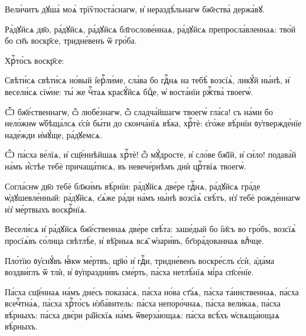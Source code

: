 \hKv Вели́читъ дꙋша̀ моѧ̀ трїѷпоста́снагѡ, и҆ нераздѣ́льнагѡ  бж҃ества̀ держа́вꙋ. 

\hKv Ра́дꙋйсѧ дв҃о, ра́дꙋйсѧ, ра́дꙋйсѧ бл҃гослове́ннаѧ, ра́дꙋйсѧ  препросла́вленнаѧ: тво́й бо сн҃ъ воскр҃се, тридне́венъ ѿ  гро́ба. 

 Хрⷭ҇то́съ воскр҃се:   
%

\hKv Свѣти́сѧ свѣти́сѧ но́вый і҆ерⷭ҇ли́ме, сла́ва бо  гдⷭ҇нѧ на тебѣ̀ возсїѧ̀, ликꙋ́й ны́нѣ, и҆ весели́сѧ  сїѡ́не: ты́ же чⷭ҇таѧ красꙋ́йсѧ бцⷣе, ѡ҆ воста́нїи ржⷭ҇тва̀  твоегѡ̀.  

\hKv Ѽ бж҃е́ственнагѡ, ѽ любе́знагѡ, ѽ сладча́йшагѡ твоегѡ̀  гла́са! съ на́ми бо нело́жнѡ ѡ҆бѣща́лсѧ є҆сѝ бы́ти до  сконча́нїѧ вѣ́ка, хрⷭ҇тѐ: є҆го́же вѣ́рнїи  ᲂу҆твержде́нїе наде́жди и҆мꙋ́ще, ра́дꙋемсѧ. 

\hKv Ѽ па́сха ве́лїѧ, и҆ сщ҃е́ннѣйшаѧ хрⷭ҇тѐ! ѽ мꙋ́дросте, и҆  сло́ве бж҃їй, и҆ си́ло! подава́й на́мъ и҆́стѣе тебѐ  причаща́тисѧ, въ невече́рнѣмъ днѝ црⷭ҇твїѧ твоегѡ̀. 

\hKv  Согла́снѡ дв҃о тебѐ бл҃жи́мъ вѣ́рнїи: ра́дꙋйсѧ  две́ре гдⷭ҇нѧ, ра́дꙋйсѧ гра́де ѡ҆дꙋшевле́нный: ра́дꙋйсѧ,  є҆ѧ́же ра́ди на́мъ ны́нѣ возсїѧ̀ свѣ́тъ, и҆з̾ тебѐ  рожде́ннагѡ и҆з̾ ме́ртвыхъ воскрⷭ҇нїѧ. 

\hKv  Весели́сѧ и҆ ра́дꙋйсѧ бж҃е́ственнаѧ две́ре  свѣ́та: заше́дый бо і҆и҃съ во гро́бъ, возсїѧ̀ просїѧ́въ  со́лнца свѣтлѣ́е, и҆ вѣ̑рныѧ всѧ̑  ѡ҆зари́въ, бг҃ора́дованнаѧ влⷣчце. 
%

\hKv Пло́тїю ᲂу҆снꙋ́въ ꙗ҆́кѡ ме́ртвъ, цр҃ю̀ и҆ гдⷭ҇и,  тридне́венъ воскре́слъ є҆сѝ, а҆да́ма воздви́глъ ѿ тлѝ,  и҆ ᲂу҆праздни́въ сме́рть, па́сха нетлѣ́нїѧ мі́ра  сп҃се́нїе. 
%



\hKv Па́сха сщ҃е́ннаѧ на́мъ дне́сь показа́сѧ, па́сха но́ва  ст҃а́ѧ, па́сха та́инственнаѧ, па́сха всечⷭ҇тна́ѧ, па́сха  хрⷭ҇то́съ и҆зба́витель: па́сха непоро́чнаѧ, па́сха вели́каѧ,  па́сха вѣ́рныхъ: па́сха двє́ри ра̑йскїѧ на́мъ  ѿверза́ющаѧ: па́сха всѣ́хъ ѡ҆свѧща́ющаѧ вѣ́рныхъ. 

